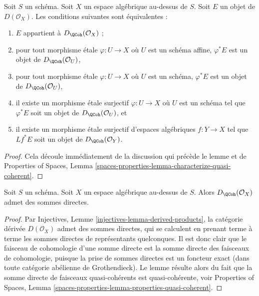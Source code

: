 \begin{lemma}
\label{lemma-check-quasi-coherence-on-covering}
Soit $S$ un schéma. Soit $X$ un espace algébrique au-dessus de $S$.
Soit $E$ un objet de $D(\mathcal{O}_X)$. Les conditions suivantes sont équivalentes :
\begin{enumerate}
\item $E$ appartient à $D_\QCoh(\mathcal{O}_X)$ ;
\item pour tout morphisme étale $\varphi : U \to X$ où $U$ est un
schéma affine, $\varphi^*E$ est un objet de
$D_\QCoh(\mathcal{O}_U)$,
\item pour tout morphisme étale $\varphi : U \to X$ où $U$ est un schéma,
$\varphi^*E$ est un objet de
$D_\QCoh(\mathcal{O}_U)$,
\item il existe un morphisme étale surjectif $\varphi : U \to X$
où $U$ est un schéma tel que $\varphi^*E$ soit un objet de
$D_\QCoh(\mathcal{O}_U)$, et
\item il existe un morphisme étale surjectif d'espaces algébriques
$f : Y \to X$ tel que $Lf^*E$ soit un objet de
$D_\QCoh(\mathcal{O}_Y)$.
\end{enumerate}
\end{lemma}

\begin{proof}
Cela découle immédiatement de la discussion qui précède le lemme et de
Properties of Spaces, Lemma
\ref{spaces-properties-lemma-characterize-quasi-coherent}.
\end{proof}

\begin{lemma}
\label{lemma-quasi-coherence-direct-sums}
Soit $S$ un schéma. Soit $X$ un espace algébrique au-dessus de $S$.
Alors $D_\QCoh(\mathcal{O}_X)$ admet des sommes directes.
\end{lemma}

\begin{proof}
Par Injectives, Lemme \ref{injectives-lemma-derived-products},
la catégorie dérivée $D(\mathcal{O}_X)$ admet des sommes directes,
qui se calculent en prenant terme à terme les sommes directes de représentants quelconques.
Il est donc clair que le faisceau de cohomologie d'une somme directe est la
somme directe des faisceaux de cohomologie, puisque la prise de sommes directes
est un foncteur exact (dans toute catégorie abélienne de Grothendieck). Le lemme
résulte alors du fait que la somme directe de faisceaux quasi-cohérents est quasi-cohérente, voir
Properties of Spaces, Lemma
\ref{spaces-properties-lemma-properties-quasi-coherent}.
\end{proof}

